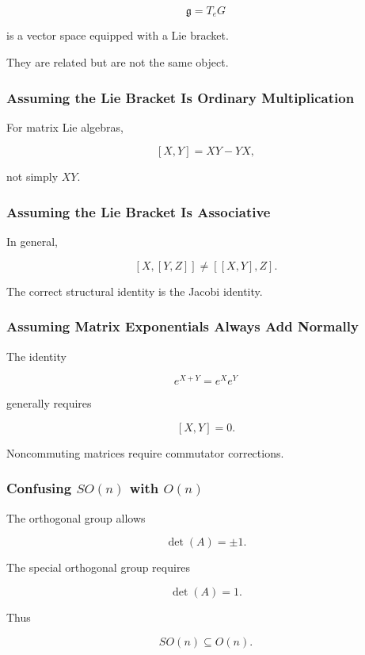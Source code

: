 \[ \mathfrak g=T_eG \]

is a vector space equipped with a Lie bracket.

They are related but are not the same object.

\subsubsection{Assuming the Lie Bracket Is Ordinary Multiplication}

For matrix Lie algebras,

\[ [X,Y]=XY-YX, \]

not simply \(XY\).

\subsubsection{Assuming the Lie Bracket Is Associative}

In general,

\[ [X,[Y,Z]]\neq[[X,Y],Z]. \]

The correct structural identity is the Jacobi identity.

\subsubsection{Assuming Matrix Exponentials Always Add Normally}

The identity

\[ e^{X+Y}=e^Xe^Y \]

generally requires

\[ [X,Y]=0. \]

Noncommuting matrices require commutator corrections.

\subsubsection{Confusing \(SO(n)\) with \(O(n)\)}

The orthogonal group allows

\[ \det(A)=\pm1. \]

The special orthogonal group requires

\[ \det(A)=1. \]

Thus

\[ SO(n)\subseteq O(n). \]

